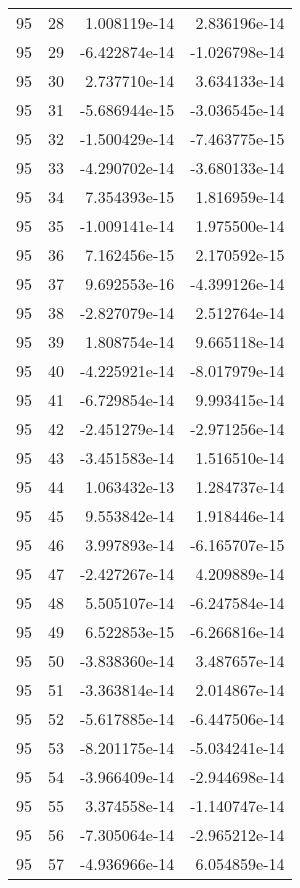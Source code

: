 \begin{tabular}{rrrr}
  95 &   28 &  1.008119e-14 &  2.836196e-14 \\
  95 &   29 & -6.422874e-14 & -1.026798e-14 \\
  95 &   30 &  2.737710e-14 &  3.634133e-14 \\
  95 &   31 & -5.686944e-15 & -3.036545e-14 \\
  95 &   32 & -1.500429e-14 & -7.463775e-15 \\
  95 &   33 & -4.290702e-14 & -3.680133e-14 \\
  95 &   34 &  7.354393e-15 &  1.816959e-14 \\
  95 &   35 & -1.009141e-14 &  1.975500e-14 \\
  95 &   36 &  7.162456e-15 &  2.170592e-15 \\
  95 &   37 &  9.692553e-16 & -4.399126e-14 \\
  95 &   38 & -2.827079e-14 &  2.512764e-14 \\
  95 &   39 &  1.808754e-14 &  9.665118e-14 \\
  95 &   40 & -4.225921e-14 & -8.017979e-14 \\
  95 &   41 & -6.729854e-14 &  9.993415e-14 \\
  95 &   42 & -2.451279e-14 & -2.971256e-14 \\
  95 &   43 & -3.451583e-14 &  1.516510e-14 \\
  95 &   44 &  1.063432e-13 &  1.284737e-14 \\
  95 &   45 &  9.553842e-14 &  1.918446e-14 \\
  95 &   46 &  3.997893e-14 & -6.165707e-15 \\
  95 &   47 & -2.427267e-14 &  4.209889e-14 \\
  95 &   48 &  5.505107e-14 & -6.247584e-14 \\
  95 &   49 &  6.522853e-15 & -6.266816e-14 \\
  95 &   50 & -3.838360e-14 &  3.487657e-14 \\
  95 &   51 & -3.363814e-14 &  2.014867e-14 \\
  95 &   52 & -5.617885e-14 & -6.447506e-14 \\
  95 &   53 & -8.201175e-14 & -5.034241e-14 \\
  95 &   54 & -3.966409e-14 & -2.944698e-14 \\
  95 &   55 &  3.374558e-14 & -1.140747e-14 \\
  95 &   56 & -7.305064e-14 & -2.965212e-14 \\
  95 &   57 & -4.936966e-14 &  6.054859e-14 \\

\end{tabular}
